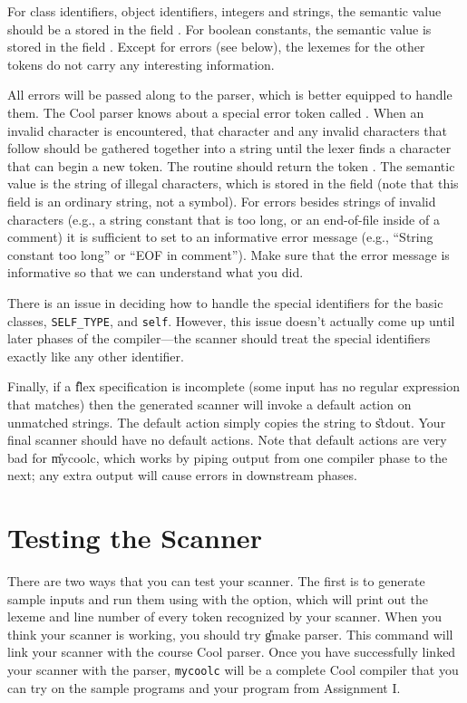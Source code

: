 For class identifiers, object identifiers, integers and strings,
the semantic value should be a  stored in the field
.  For boolean constants, the semantic value is stored
in the field .  Except for errors (see below), the 
lexemes for the other tokens do not carry any interesting information.

All errors will be passed along to the parser, which is better
equipped to handle them.  The Cool parser knows about a special error
token called .  When an invalid character is encountered,
that character and any invalid characters that follow should be
gathered together into a string until the lexer finds a character that
can begin a new token.  The routine  should return the token
.  The semantic value is the string of illegal characters,
which is stored in the field  (note that this
field is an ordinary string, not a symbol).  For errors besides
strings of invalid characters (e.g., a string constant that is too
long, or an end-of-file inside of a comment) it is sufficient to set
 to an informative error message (e.g., ``String
constant too long'' or ``EOF in comment'').  Make sure that the error
message is informative so that we can understand what you did.

There is an issue in deciding how to handle the special identifiers
for the basic classes, {\tt SELF\_TYPE}, and {\tt self}.  However,
this issue doesn't actually come up until later phases of the
compiler---the scanner should treat the special identifiers exactly
like any other identifier.

Finally, if a \U{flex} specification is incomplete (some input has no
regular expression that matches) then the generated scanner will invoke
a default action on unmatched strings.  The default action simply copies
the string to \U{stdout}.  Your final scanner should have no default
actions.  Note that default actions are very bad for \U{mycoolc}, which
works by piping output from one compiler phase to the next; any
extra output will cause errors in downstream phases.

\section{Testing the Scanner}

There are two ways that you can test your scanner.  The first is to
generate sample inputs and run them using  with the
 option, which will print out the lexeme and line number of every token 
recognized by your scanner.  When you think your scanner is working,
you should try \U{gmake parser}.  This command will link your scanner
with the course Cool parser.  Once you have successfully linked your
scanner with the parser, {\tt mycoolc} will be a complete Cool compiler
that you can try on the sample programs and your program from Assignment I.

